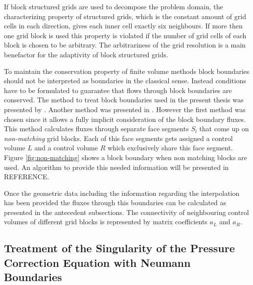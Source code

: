   If block structured grids are used to decompose the problem domain, the characterizing property of structured grids, which is the constant amount of grid cells in each direction, gives each inner cell exactly six neighbours. If more then one grid block is used this property is violated if the number of grid cells of each block is chosen to be arbitrary. The arbitrariness of the grid resolution is a main benefactor for the adaptivity of block structured grids.

  To maintain the conservation property of finite volume methods block boundaries should not be interpreted as boundaries in the classical sense. Instead conditions have to be formulated to guarantee that flows through block boundaries are conserved. The method to treat block boundaries used in the present thesis was presented by \cite{lilek97}. Another method was presented in \cite{lange02}. However the first method was chosen since it allows a fully implicit consideration of the block boundary fluxes. This method calculates fluxes through separate face segments \(S_l\) that come up on \emph{non-matching} grid blocks. Each of this face segments gets assigned a control volume \(L\) and a control volume \(R\) which exclusively share this face segment. Figure \ref{fig:non-matching} shows a block boundary when non matching blocks are used. An algorithm to provide this needed information will be presented in REFERENCE.


  Once the geometric data including the information regarding the interpolation has been provided the fluxes through this boundaries can be calculated as presented in the antecedent subsections. The connectivity of neighbouring control volumes of different grid blocks is represented by matrix coefficients \(a_L\) and \(a_R\).

  \subsection{Treatment of the Singularity of the Pressure Correction Equation with Neumann Boundaries}
  \label{sec:singularitytreatment}

